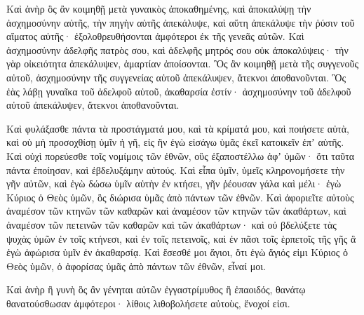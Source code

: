 {Καὶ ἀνὴρ ὃς ἂν κοιμηθῇ μετὰ γυναικὸς ἀποκαθημένης, καὶ ἀποκαλύψῃ τὴν ἀσχημοσύνην αὐτῆς, τὴν πηγὴν αὐτῆς ἀπεκάλυψε, καὶ αὕτη ἀπεκάλυψε τὴν ῥύσιν τοῦ αἵματος αὐτῆς· ἐξολοθρευθήσονται ἀμφότεροι ἐκ τῆς γενεᾶς αὐτῶν.
Καὶ ἀσχημοσύνην ἀδελφῆς πατρὸς σου, καὶ ἀδελφῆς μητρός σου οὐκ ἀποκαλύψεις· τὴν γὰρ οἰκειότητα ἀπεκάλυψεν, ἁμαρτίαν ἀποίσονται.
Ὃς ἂν κοιμηθῇ μετὰ τῆς συγγενοῦς αὐτοῦ, ἀσχημοσύνην τῆς συγγενείας αὐτοῦ ἀπεκάλυψεν, ἄτεκνοι ἀποθανοῦνται.
Ὃς ἐὰς λάβῃ γυναῖκα τοῦ ἀδελφοῦ αὐτοῦ, ἀκαθαρσία ἐστίν· ἀσχημοσύνην τοῦ ἀδελφοῦ αὐτοῦ ἀπεκάλυψεν, ἄτεκνοι ἀποθανοῦνται.
\par }{\PP {}Καὶ φυλάξασθε πάντα τὰ προστάγματά μου, καὶ τὰ κρίματά μου, καὶ ποιήσετε αὐτὰ, καὶ οὐ μὴ προσοχθίσῃ ὑμῖν ἡ γῆ, εἰς ἣν ἐγὼ εἰσάγω ὑμᾶς ἐκεῖ κατοικεῖν ἐπʼ αὐτῆς.
Καὶ οὐχὶ πορεύεσθε τοῖς νομίμοις τῶν ἐθνῶν, οὓς ἐξαποστέλλω ἀφʼ ὑμῶν· ὅτι ταῦτα πάντα ἐποίησαν, καὶ ἐβδελυξάμην αὐτούς.
Καὶ εἶπα ὑμῖν, ὑμεῖς κληρονομήσετε τὴν γῆν αὐτῶν, καὶ ἐγὼ δώσω ὑμῖν αὐτὴν ἐν κτήσει, γῆν ῥέουσαν γάλα καὶ μέλι· ἐγὼ Κύριος ὁ Θεὸς ὑμῶν, ὃς διώρισα ὑμᾶς ἀπὸ πάντων τῶν ἐθνῶν.
Καὶ ἀφοριεῖτε αὐτοὺς ἀναμέσον τῶν κτηνῶν τῶν καθαρῶν καὶ ἀναμέσον τῶν κτηνῶν τῶν ἀκαθάρτων, καὶ ἀναμέσον τῶν πετεινῶν τῶν καθαρῶν καὶ τῶν ἀκαθάρτων· καὶ οὐ βδελύξετε τὰς ψυχὰς ὑμῶν ἐν τοῖς κτήνεσι, καὶ ἐν τοῖς πετεινοῖς, καὶ ἐν πᾶσι τοῖς ἑρπετοῖς τῆς γῆς ἃ ἐγὼ ἀφώρισα ὑμῖν ἐν ἀκαθαρσίᾳ.
Καὶ ἔσεσθέ μοι ἅγιοι, ὅτι ἐγὼ ἅγιός εἰμι Κύριος ὁ Θεὸς ὑμῶν, ὁ ἀφορίσας ὑμᾶς ἀπὸ πάντων τῶν ἐθνῶν, εἶναί μοι.
\par }{\PP {}Καὶ ἀνὴρ ἢ γυνὴ ὃς ἂν γένηται αὐτῶν ἐγγαστρίμυθος ἢ ἐπαοιδός, θανάτῳ θανατούσθωσαν ἀμφότεροι· λίθοις λιθοβολήσετε αὐτοὺς, ἔνοχοί εἰσι.

}
